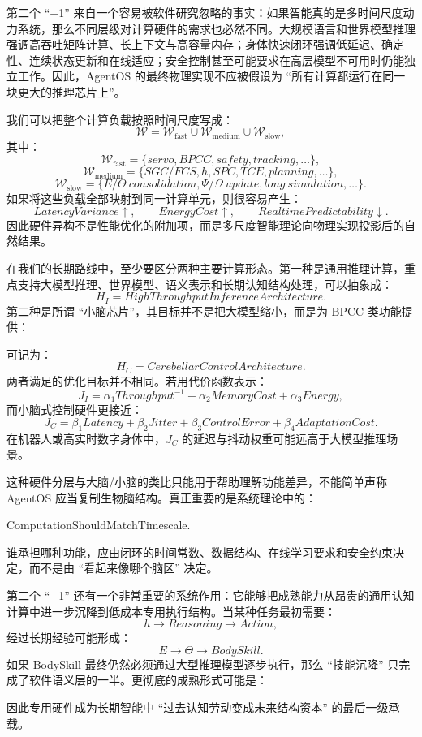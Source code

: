 第二个 ``+1'' 来自一个容易被软件研究忽略的事实：如果智能真的是多时间尺度动力系统，那么不同层级对计算硬件的需求也必然不同。大规模语言和世界模型推理强调高吞吐矩阵计算、长上下文与高容量内存；身体快速闭环强调低延迟、确定性、连续状态更新和在线适应；安全控制甚至可能要求在高层模型不可用时仍能独立工作。因此，AgentOS 的最终物理实现不应被假设为 ``所有计算都运行在同一块更大的推理芯片上''。

我们可以把整个计算负载按照时间尺度写成：
\[
\mathcal W
=
\mathcal W_{\mathrm{fast}}
\cup
\mathcal W_{\mathrm{medium}}
\cup
\mathcal W_{\mathrm{slow}},
\]
其中：
\[
\mathcal W_{\mathrm{fast}}
=
\{servo,BPCC,safety,tracking,\ldots\},
\]
\[
\mathcal W_{\mathrm{medium}}
=
\{SGC/FCS,h,SPC,TCE,planning,\ldots\},
\]
\[
\mathcal W_{\mathrm{slow}}
=
\{E/\Theta\ consolidation,\Psi/\Omega\ update,long\ simulation,\ldots\}.
\]
如果将这些负载全部映射到同一计算单元，则很容易产生：
\[
LatencyVariance\uparrow,
\qquad
EnergyCost\uparrow,
\qquad
RealtimePredictability\downarrow.
\]
因此硬件异构不是性能优化的附加项，而是多尺度智能理论向物理实现投影后的自然结果。

在我们的长期路线中，至少要区分两种主要计算形态。第一种是通用推理计算，重点支持大模型推理、世界模型、语义表示和长期认知结构处理，可以抽象成：
\[
H_I
=
HighThroughputInferenceArchitecture.
\]
第二种是所谓 ``小脑芯片''，其目标并不是把大模型缩小，而是为 BPCC 类功能提供：
\begin{statementbox}
\centering
{}
\end{statementbox}
可记为：
\[
H_C
=
CerebellarControlArchitecture.
\]
两者满足的优化目标并不相同。若用代价函数表示：
\[
J_I
=
\alpha_1 Throughput^{-1}
+
\alpha_2 MemoryCost
+
\alpha_3 Energy,
\]
而小脑式控制硬件更接近：
\[
J_C
=
\beta_1 Latency
+
\beta_2 Jitter
+
\beta_3 ControlError
+
\beta_4 AdaptationCost.
\]
在机器人或高实时数字身体中，$J_C$ 的延迟与抖动权重可能远高于大模型推理场景。

这种硬件分层与大脑/小脑的类比只能用于帮助理解功能差异，不能简单声称 AgentOS 应当复制生物脑结构。真正重要的是系统理论中的：
\begin{statementbox}
ComputationShouldMatchTimescale.
\end{statementbox}
谁承担哪种功能，应由闭环的时间常数、数据结构、在线学习要求和安全约束决定，而不是由 ``看起来像哪个脑区'' 决定。

第二个 ``+1'' 还有一个非常重要的系统作用：它能够把成熟能力从昂贵的通用认知计算中进一步沉降到低成本专用执行结构。当某种任务最初需要：
\[
h
\rightarrow
Reasoning
\rightarrow
Action,
\]
经过长期经验可能形成：
\[
E
\rightarrow
\Theta
\rightarrow
BodySkill.
\]
如果 BodySkill 最终仍然必须通过大型推理模型逐步执行，那么 ``技能沉降'' 只完成了软件语义层的一半。更彻底的成熟形式可能是：
\begin{statementbox}
\centering
{}
\end{statementbox}
因此专用硬件成为长期智能中 ``过去认知劳动变成未来结构资本'' 的最后一级承载。


